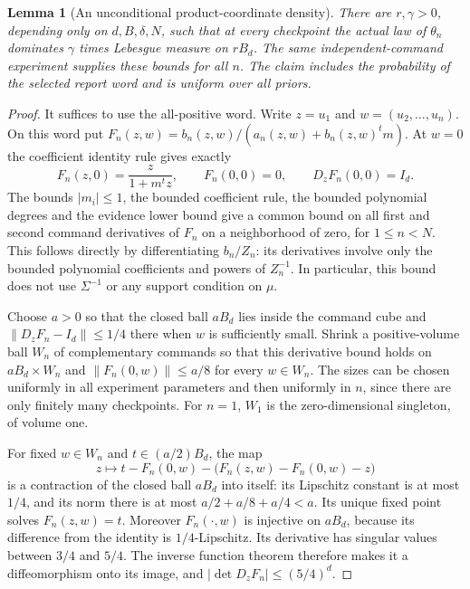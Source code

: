 \documentclass[11pt]{amsart}
\newtheorem{lemma}[theorem]{Lemma}
\theoremstyle{definition}\newtheorem{definition}[theorem]{Definition}
\theoremstyle{remark}\newtheorem{remark}[theorem]{Remark}
\begin{document}
\begin{lemma}[An unconditional product-coordinate density]
\label{lem:algebra-acquired-density}
There are $r,\gamma>0$, depending only on $d,B,\delta,N$, such that
at every checkpoint the actual law of $\theta_n$ dominates
$\gamma$ times Lebesgue measure on $rB_d$. The same independent-command
experiment supplies these bounds for all $n$. The claim includes the
probability of the selected report word and is uniform over all priors.
\end{lemma}
\begin{proof}
It suffices to use the all-positive word. Write $z=u_1$ and
$w=(u_2,\ldots,u_n)$. On this word put
$F_n(z,w)=b_n(z,w)/(a_n(z,w)+b_n(z,w)^tm)$.
At $w=0$ the coefficient identity rule gives exactly
\[
 F_n(z,0)=\frac{z}{1+m^tz},\qquad F_n(0,0)=0,
                \qquad D_zF_n(0,0)=I_d.
\]
The bounds $|m_i|\le1$, the bounded coefficient rule, the bounded
polynomial degrees and the evidence lower bound give a common bound
on all first and second command derivatives of $F_n$ on a neighborhood
of zero, for $1\le n<N$. This follows directly by differentiating
$b_n/Z_n$: its derivatives involve only the bounded polynomial
coefficients and powers of $Z_n^{-1}$. In particular, this bound does
not use $\Sigma^{-1}$ or any support condition on $\mu$.

Choose $a>0$ so that the closed ball $aB_d$ lies inside the command
cube and $\|D_zF_n-I_d\|\le1/4$ there when $w$ is sufficiently
small. Shrink a positive-volume ball $W_n$ of complementary commands
so that this derivative bound holds on $aB_d\times W_n$ and
$\|F_n(0,w)\|\le a/8$ for every $w\in W_n$.
The sizes can be chosen uniformly in all experiment parameters and
then uniformly in $n$, since there are only finitely many checkpoints.
For $n=1$, $W_1$ is the zero-dimensional singleton, of volume one.

For fixed $w\in W_n$ and $t\in(a/2)B_d$, the map
\[
 z\longmapsto t-F_n(0,w)-\bigl(F_n(z,w)-F_n(0,w)-z\bigr)
\]
is a contraction of the closed ball $aB_d$ into itself: its Lipschitz
constant is at most $1/4$, and its norm there is at most
$a/2+a/8+a/4<a$. Its unique fixed point solves $F_n(z,w)=t$.
Moreover $F_n(\cdot,w)$ is injective on $aB_d$, because its difference
from the identity is $1/4$-Lipschitz. Its derivative has singular
values between $3/4$ and $5/4$. The inverse function theorem therefore
makes it a diffeomorphism onto its image, and
$|\det D_zF_n|\le(5/4)^d$.


\end{proof}
\end{document}

